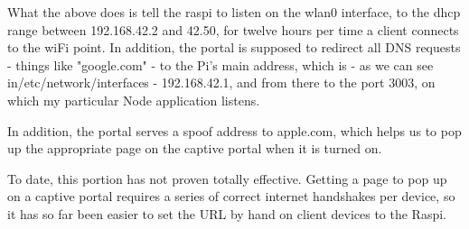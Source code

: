 What the above does is tell the raspi to listen on the wlan0 interface, to the dhcp range between 192.168.42.2 and 42.50, for twelve hours per time a client connects to the wiFi point.  In addition, the portal is supposed to redirect all DNS requests - things like "google.com" - to the Pi's main address, which is - as we can see in/etc/network/interfaces - 192.168.42.1, and from there to the port 3003, on which my particular Node application listens.

In addition, the portal serves a spoof address to apple.com, which helps us to pop up the appropriate page on the captive portal when it is turned on. 

To date, this portion has not proven totally effective. Getting a page to pop up on a captive portal requires a series of correct internet handshakes per device, so it has so far been easier to set the URL by hand on client devices to the Raspi.
 

